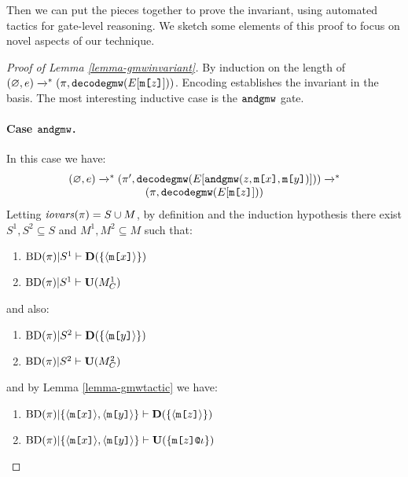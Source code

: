 Then we can put the pieces together to prove the invariant, using automated tactics
for gate-level reasoning. We sketch some elements of this proof to focus on
novel aspects of our technique. 
\begin{proof}[Proof of Lemma \ref{lemma-gmwinvariant}]
  By induction on the length of $(\varnothing,e) \xrightarrow{}^{*} (\pi,\texttt{decodegmw}(E[\texttt{m[}z\texttt{]}]))$.
  Encoding establishes the invariant in the basis. The most interesting inductive
  case is the $\texttt{andgmw}$ gate. 
  \paragraph{Case $\texttt{andgmw}$.} In this case we have:
  $$
  \begin{array}{c}
  (\varnothing,e) \xrightarrow{}^{*} (\pi',\texttt{decodegmw}(E[\texttt{andgmw}(z,\texttt{m[}x\texttt{]},\texttt{m[}y\texttt{]})])) \xrightarrow{}^{*} \\
    (\pi,\texttt{decodegmw}(E[\texttt{m[}z\texttt{]}]))
  \end{array}
  $$
  Letting $\mathit{iovars}(\pi) = S \cup M$, by definition and the induction hypothesis there
  exist $S^1,S^2 \subseteq S$ and $M^1,M^2 \subseteq M$
  such that:
  \begin{enumerate}[\hspace{5mm}(x.1)]
  \item $\mathrm{BD}(\pi)|S^1 \vdash \mathbf{D}(\{\langle \texttt{m[}x\texttt{]} \rangle\})$
  \item $\mathrm{BD}(\pi)|S^1 \vdash \mathbf{U}(M^1_C)$
  \end{enumerate}
  and also:
  \begin{enumerate}[\hspace{5mm}(y.1)]
  \item $\mathrm{BD}(\pi)|S^2 \vdash \mathbf{D}(\{\langle \texttt{m[}y\texttt{]} \rangle\})$
  \item $\mathrm{BD}(\pi)|S^2 \vdash \mathbf{U}(M^2_C)$
  \end{enumerate}
  and by Lemma \ref{lemma-gmwtactic} we have:
  \begin{enumerate}[\hspace{5mm}(z.1)]
  \item
    $\mathrm{BD}(\pi)|\{ \langle \texttt{m[}x\texttt{]} \rangle,\langle \texttt{m[}y\texttt{]} \rangle \} \vdash \mathbf{D}(\{ \langle \texttt{m[}z\texttt{]} \rangle \})$
  \item $\mathrm{BD}(\pi)|\{ \langle \texttt{m[}x\texttt{]} \rangle,\langle \texttt{m[}y\texttt{]} \rangle \} \vdash \mathbf{U}(\{ \texttt{m[}z\texttt{]}\texttt{@}\iota \})$

\end{enumerate}
\end{proof}
